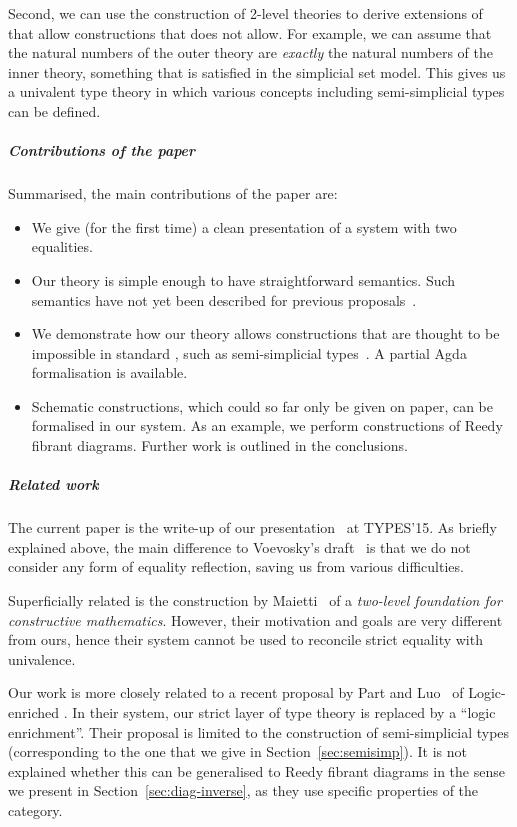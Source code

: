 \documentclass[a4paper,reqno]{amsart}
\theoremstyle{plain}
\theoremstyle{definition}
\begin{document}
Second, we can use the construction of 2-level theories to derive extensions of  that allow constructions that  does not allow.
For example, we can assume that the natural numbers of the outer theory are \emph{exactly} the natural numbers of the inner theory, something that is satisfied in the simplicial set model.
This gives us a univalent type theory in which various concepts including semi-simplicial types can be defined.

\subparagraph*{Contributions of the paper}
Summarised, the main contributions of the paper are:
\begin{itemize}
 \item We give (for the first time) a clean presentation of a system with two equalities.
 \item Our theory is simple enough to have straightforward semantics. Such semantics have not yet been described for previous proposals~\cite{voe_hts,DBLP:journals/corr/PartL15}.
 \item We demonstrate how our theory allows constructions that are thought to be impossible in standard , such as semi-simplicial types~\cite{herbelin_semisimpl,DBLP:journals/corr/PartL15}. A partial \textsf{Agda} formalisation is available.
 \item Schematic constructions, which could so far only be given on paper, can be formalised in our system. As an example, we perform constructions of Reedy fibrant diagrams. Further work is outlined in the conclusions.
\end{itemize}


\subparagraph*{Related work}
The current paper is the write-up of our presentation~\cite{altenkirch_twolevels} at TYPES'15.
As briefly explained above, the main difference to Voevosky's draft~\cite{voe_hts} is that we do not consider any form of equality reflection, saving us from various difficulties.

Superficially related is the construction by Maietti~\cite{Maietti2009319} of a \emph{two-level foundation for constructive mathematics}. However, their motivation and goals are very different from ours, hence their system cannot be used to reconcile strict equality with univalence.  

Our work is more closely related to a recent proposal by Part and Luo~\cite{DBLP:journals/corr/PartL15} of Logic-enriched . 
In their system, our strict layer of type theory is replaced by a ``logic enrichment''.
Their proposal is limited to the construction of semi-simplicial types (corresponding to the one that we give in Section~\ref{sec:semisimp}). 
It is not explained whether this can be generalised to Reedy fibrant diagrams in the sense we present in Section~\ref{sec:diag-inverse}, as they use specific properties of the  category.
\end{document}

